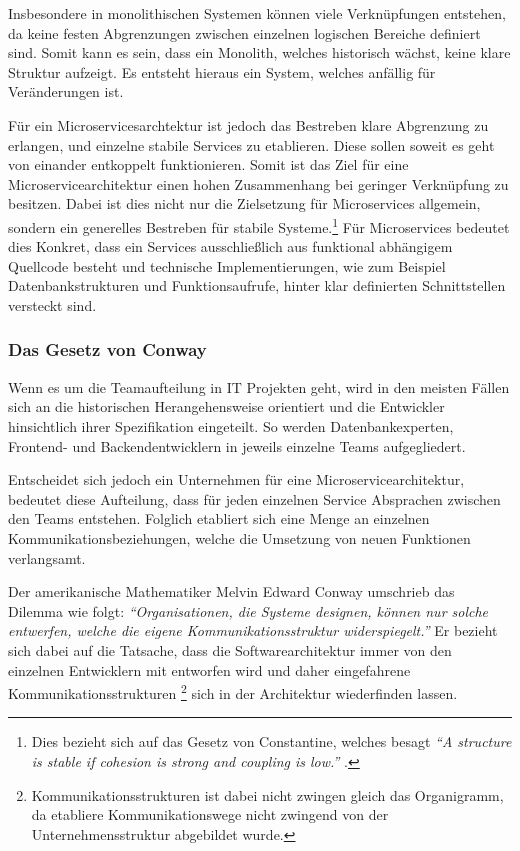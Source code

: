 Insbesondere in monolithischen Systemen können viele Verknüpfungen entstehen, da keine festen Abgrenzungen zwischen einzelnen logischen Bereiche definiert sind. Somit kann es sein, dass ein Monolith, welches historisch wächst, keine klare Struktur aufzeigt. Es entsteht hieraus ein System, welches anfällig für Veränderungen ist.

Für ein Microservicesarchtektur ist jedoch das Bestreben klare Abgrenzung zu erlangen, und einzelne stabile Services zu etablieren. Diese sollen soweit es geht von einander entkoppelt funktionieren. Somit ist das Ziel für eine Microservicearchitektur einen hohen Zusammenhang bei geringer Verknüpfung zu besitzen. Dabei ist dies nicht nur die Zielsetzung für Microservices allgemein, sondern ein generelles Bestreben für stabile Systeme.\footnote{Dies bezieht sich auf das Gesetz von Constantine, welches besagt \textit{\enquote{A structure is stable if cohesion is strong and coupling is low.}} \parencite[S. 43]{endres_handbook_2003}.} Für Microservices bedeutet dies Konkret, dass ein Services ausschließlich aus funktional abhängigem Quellcode besteht und technische Implementierungen, wie zum Beispiel Datenbankstrukturen und Funktionsaufrufe, hinter klar definierten Schnittstellen versteckt sind.

\subsubsection{Das Gesetz von Conway}

Wenn es um die Teamaufteilung in IT Projekten geht, wird in den meisten Fällen sich an die historischen Herangehensweise orientiert und die Entwickler hinsichtlich ihrer Spezifikation eingeteilt. So werden Datenbankexperten, Frontend- und Backendentwicklern in jeweils einzelne Teams aufgegliedert.

Entscheidet sich jedoch ein Unternehmen für eine Microservicearchitektur, bedeutet diese Aufteilung, dass für jeden einzelnen Service Absprachen zwischen den Teams entstehen. Folglich etabliert sich eine Menge an einzelnen Kommunikationsbeziehungen, welche die  Umsetzung von neuen Funktionen verlangsamt.

Der amerikanische Mathematiker Melvin Edward Conway umschrieb das Dilemma wie folgt:
\textit{\enquote{Organisationen, die Systeme designen, können nur solche entwerfen, welche die eigene Kommunikationsstruktur widerspiegelt.}}
Er bezieht sich dabei auf die Tatsache, dass die Softwarearchitektur immer von den einzelnen Entwicklern mit entworfen wird und daher eingefahrene Kommunikationsstrukturen \footnote{Kommunikationsstrukturen ist dabei nicht zwingen gleich das Organigramm, da etabliere Kommunikationswege nicht zwingend von der Unternehmensstruktur abgebildet wurde.} sich in der Architektur wiederfinden lassen.

